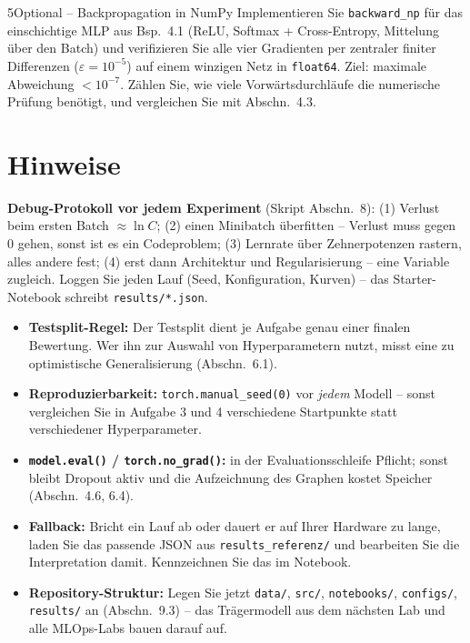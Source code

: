 \documentclass[11pt,a4paper]{article}
\newcommand{\code}[1]{\texttt{#1}}
\begin{document}
\begin{aufgabe}{5}{Optional -- Backpropagation in NumPy}
Implementieren Sie \code{backward\_np} für das einschichtige MLP aus Bsp.\ 4.1 (ReLU, Softmax + Cross-Entropy, Mittelung über den Batch) und verifizieren Sie alle vier Gradienten per zentraler finiter Differenzen ($\varepsilon = 10^{-5}$) auf einem winzigen Netz in \code{float64}. Ziel: maximale Abweichung $< 10^{-7}$. Zählen Sie, wie viele Vorwärtsdurchläufe die numerische Prüfung benötigt, und vergleichen Sie mit Abschn.\ 4.3.
\end{aufgabe}

\section*{Hinweise}
\begin{hinweis}\small
\textbf{Debug-Protokoll vor jedem Experiment} (Skript Abschn.\ 8): (1) Verlust beim ersten Batch $\approx \ln C$; (2) einen Minibatch überfitten -- Verlust muss gegen 0 gehen, sonst ist es ein Codeproblem; (3) Lernrate über Zehnerpotenzen rastern, alles andere fest; (4) erst dann Architektur und Regularisierung -- eine Variable zugleich. Loggen Sie jeden Lauf (Seed, Konfiguration, Kurven) -- das Starter-Notebook schreibt \code{results/*.json}.
\end{hinweis}
\begin{itemize}
  \item \textbf{Testsplit-Regel:} Der Testsplit dient je Aufgabe genau einer finalen Bewertung. Wer ihn zur Auswahl von Hyperparametern nutzt, misst eine zu optimistische Generalisierung (Abschn.\ 6.1).
  \item \textbf{Reproduzierbarkeit:} \code{torch.manual\_seed(0)} vor \emph{jedem} Modell -- sonst vergleichen Sie in Aufgabe 3 und 4 verschiedene Startpunkte statt verschiedener Hyperparameter.
  \item \textbf{\code{model.eval()} / \code{torch.no\_grad()}:} in der Evaluationsschleife Pflicht; sonst bleibt Dropout aktiv und die Aufzeichnung des Graphen kostet Speicher (Abschn.\ 4.6, 6.4).
  \item \textbf{Fallback:} Bricht ein Lauf ab oder dauert er auf Ihrer Hardware zu lange, laden Sie das passende JSON aus \code{results\_referenz/} und bearbeiten Sie die Interpretation damit. Kennzeichnen Sie das im Notebook.
  \item \textbf{Repository-Struktur:} Legen Sie jetzt \code{data/}, \code{src/}, \code{notebooks/}, \code{configs/}, \code{results/} an (Abschn.\ 9.3) -- das Trägermodell aus dem nächsten Lab und alle MLOps-Labs bauen darauf auf.
\end{itemize}
\end{document}
